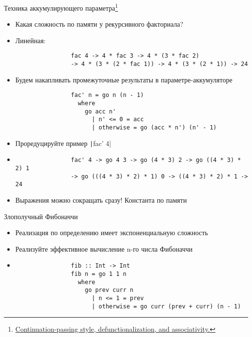     \begin{frame}[fragile]{Техника аккумулирующего параметра\footnote{\href{https://youtu.be/8gnhaE2nmQ0?si=A8lDF9pJqa_07x9q}{\color{blue} \advanced Continuation-passing style, defunctionalization, and associativity.}}}
        \begin{itemize}
            \item[\todo] Какая сложность по памяти у рекурсивного факториала?
            \item[\answer] \pause Линейная:
            \begin{verbatim}
                fac 4 -> 4 * fac 3 -> 4 * (3 * fac 2)
                -> 4 * (3 * (2 * fac 1)) -> 4 * (3 * (2 * 1)) -> 24
            \end{verbatim}
            \item Будем накапливать промежуточные результаты в параметре-аккумуляторе
            \begin{verbatim}
                fac' n = go n (n - 1)
                  where
                    go acc n'
                      | n' <= 0 = acc
                      | otherwise = go (acc * n') (n' - 1)
            \end{verbatim}
            \item[\todo] Проредуцируйте пример \texttt|fac' 4|
            \item[\answer] \pause
            \begin{verbatim}
                fac' 4 -> go 4 3 -> go (4 * 3) 2 -> go ((4 * 3) * 2) 1
                -> go (((4 * 3) * 2) * 1) 0 -> ((4 * 3) * 2) * 1 -> 24
            \end{verbatim}
            \item Выражения можно сокращать сразу! Константа по памяти
        \end{itemize}
    \end{frame}

    \begin{frame}[fragile]{Злополучный Фибоначчи}
        \begin{itemize}
            \item Реализация по определению имеет экспоненциальную сложность
            \item[\todo] Реализуйте эффективное вычисление n-го числа Фибоначчи
            \item[\answer] \pause
            \begin{verbatim}
                fib :: Int -> Int
                fib n = go 1 1 n
                  where
                    go prev curr n
                      | n <= 1 = prev
                      | otherwise = go curr (prev + curr) (n - 1)
            \end{verbatim}
        \end{itemize}
    \end{frame}

